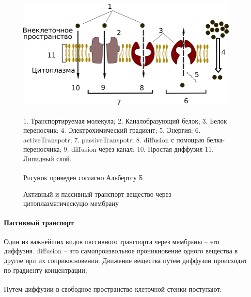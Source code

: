 \begin{figure}[h!]
  \centering
       \includegraphics[width=0.7\linewidth]{pictures/celltransport}
\caption{Активный и пассивный транспорт вещество через цитоплазматическуцю мембрану}


\paragraph*{}1. Транспортируемая молекула; 2. Каналобразующий белок; 3. Белок переносчик; 4. Электрохимический градиент; 5. Энергия; 6. \gls{activeTranspotr}; 7. \gls{passiveTranspotr}; 8. \gls{diffusion} с помощью белка-переносчика; 9. \gls{diffusion} через канал; 10. Простая диффузия 11. Липидный слой. 

\paragraph*{}Рисунок приведен согласно Альбертсу Б \cite{alberts_2013}

\label{celltransport}
\end{figure}

\paragraph*{Пассивный транспорт}

\paragraph*{}Один из важнейших видов пассивного транспорта через мембраны -- это диффузия. \hypertarget{diffusion}{\gls{diffusion}} -- это самопроизвольное проникновение одного вещества в другое при их соприкосновении. Движение вещества путем диффузии происходит по градиенту концентрации; 

\paragraph*{}Путем диффузии в свободное пространство клеточной стенки поступают:

